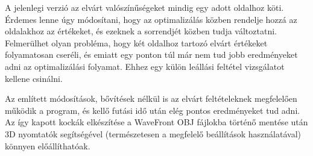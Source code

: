 A jelenlegi verzió az elvárt valószínűségeket mindig egy adott oldalhoz köti. Érdemes lenne úgy módosítani, hogy az optimalizálás közben rendelje hozzá az oldalakhoz az értékeket, és ezeknek a sorrendjét közben tudja változtatni.
Felmerülhet olyan probléma, hogy két oldalhoz tartozó elvárt értékeket folyamatosan cseréli, és emiatt egy ponton túl már nem tud jobb eredményeket adni az optimalizálási folyamat.
Ehhez egy külön leállási feltétel vizsgálatot kellene csinálni.

Az említett módosítások, bővítések nélkül is az elvárt feltételeknek megfelelően működik a program, és kellő futási idő után elég pontos eredményeket tud adni.
Az így kapott kockák elkészítése a WaveFront OBJ fájlokba történő mentése után 3D nyomtatók segítségével (természetesen a megfelelő beállítások használatával) könnyen előállíthatóak.
